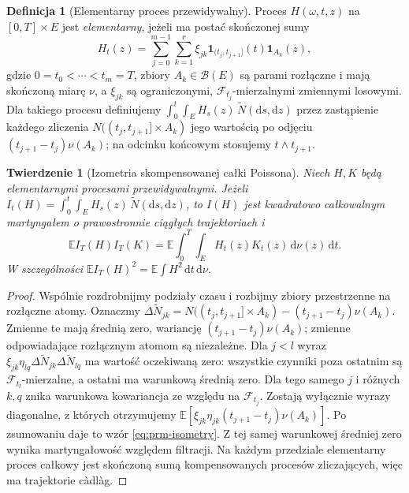 \documentclass[11pt,a4paper,oneside]{report}
\numberwithin{equation}{chapter}
\theoremstyle{plain}
\newtheorem{twierdzenie}{Twierdzenie}[chapter]
\theoremstyle{definition}
\newtheorem{definicja}{Definicja}[chapter]
\theoremstyle{remark}
\newcommand{\E}{\mathbb{E}}
\newcommand{\calF}{\mathcal{F}}
\newcommand{\calB}{\mathcal{B}}
\newcommand{\ind}[1]{\mathbf{1}_{#1}}
\newcommand{\dd}{\mathrm{d}}
\begin{document}
\begin{definicja}[Elementarny proces przewidywalny]
\label{def:prm-step}
Proces $H(\omega,t,z)$ na $[0,T]\times E$ jest
\emph{elementarny}, jeżeli ma postać skończonej sumy
\[
H_t(z)=\sum_{j=0}^{m-1}\sum_{k=1}^{r}
\xi_{jk}\ind{(t_j,t_{j+1}]}(t)\ind{A_k}(z),
\]
gdzie $0=t_0<\cdots<t_m=T$, zbiory $A_k\in\calB(E)$
są parami rozłączne i mają skończoną miarę $\nu$,
a $\xi_{jk}$ są ograniczonymi, $\calF_{t_j}$-mierzalnymi
zmiennymi losowymi. Dla takiego procesu definiujemy
$\int_0^t\int_EH_s(z)\,\widetilde N(\dd s,\dd z)$
przez zastąpienie każdego zliczenia $N((t_j,t_{j+1}]\times A_k)$
jego wartością po odjęciu $(t_{j+1}-t_j)\nu(A_k)$;
na odcinku końcowym stosujemy $t\wedge t_{j+1}$.
\end{definicja}

\begin{twierdzenie}[Izometria skompensowanej całki Poissona]
\label{th:prm-isometry}
Niech $H,K$ będą elementarnymi procesami przewidywalnymi.
Jeżeli $I_t(H)=\int_0^t\int_EH_s(z)\,\widetilde N(\dd s,\dd z)$,
to $I(H)$ jest kwadratowo całkowalnym martyngałem o
prawostronnie ciągłych trajektoriach i
\[
\E I_T(H)I_T(K)
=\E\int_0^T\int_E H_t(z)K_t(z)\,\dd\nu(z)\,\dd t.
\tag{11.2}\label{eq:prm-isometry}
\]
W szczególności $\E I_T(H)^2=\E\int H^2\,\dd t\,\dd\nu$.
\end{twierdzenie}
\begin{proof}
Wspólnie rozdrobnijmy podziały czasu i rozbijmy zbiory
przestrzenne na rozłączne atomy. Oznaczmy
$\Delta\widetilde N_{jk}=N((t_j,t_{j+1}]\times A_k)
-(t_{j+1}-t_j)\nu(A_k)$.
Zmienne te mają średnią zero, wariancję
$(t_{j+1}-t_j)\nu(A_k)$; zmienne odpowiadające
rozłącznym atomom są niezależne. Dla $j<l$ wyraz
$\xi_{jk}\eta_{lq}\Delta\widetilde N_{jk}
\Delta\widetilde N_{lq}$ ma wartość oczekiwaną zero:
wszystkie czynniki poza ostatnim są $\calF_{t_l}$-mierzalne,
a ostatni ma warunkową średnią zero. Dla tego samego $j$
i różnych $k,q$ znika warunkowa kowariancja ze względu
na $\calF_{t_j}$. Zostają wyłącznie wyrazy diagonalne,
z których otrzymujemy
$\E[\xi_{jk}\eta_{jk}(t_{j+1}-t_j)\nu(A_k)]$.
Po zsumowaniu daje to wzór \eqref{eq:prm-isometry}.
Z tej samej warunkowej średniej zero wynika martyngałowość
względem filtracji. Na każdym przedziale elementarny
proces całkowy jest skończoną sumą kompensowanych
procesów zliczających, więc ma trajektorie càdlàg.
\end{proof}
\end{document}
